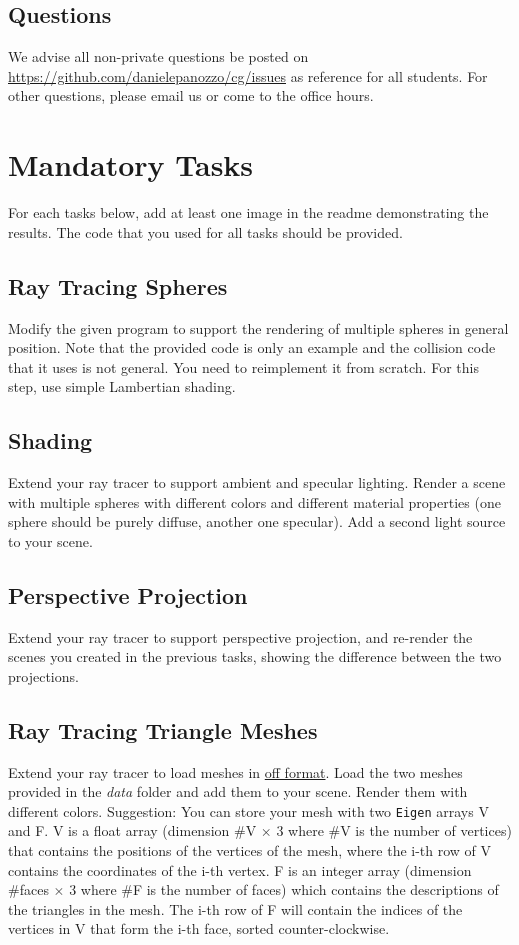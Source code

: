 \documentclass[11pt]{article}
\begin{document}
\subsection*{Questions}

We advise all non-private questions be posted on \url{https://github.com/danielepanozzo/cg/issues} as reference for all students.
For other questions, please email us or come to the office hours.
\section{Mandatory Tasks}
For each tasks below, add at least one image in the readme demonstrating the results. The code that you used for all tasks should be provided.

\subsection{Ray Tracing Spheres}

Modify the given program to support the rendering of multiple spheres in general position. Note that the provided code is only an example and the collision code that it uses is not general. You need to reimplement it from scratch.
For this step, use simple Lambertian shading. 

\subsection{Shading}

Extend your ray tracer to support ambient and specular lighting. Render a scene with multiple spheres with different colors and different material properties (one sphere should be purely diffuse, another one specular).
Add a second light source to your scene.

\subsection{Perspective Projection}

Extend your ray tracer to support perspective projection, and re-render the scenes you created in the previous tasks, showing the difference between the two projections.

\subsection{Ray Tracing Triangle Meshes}

Extend your ray tracer to load meshes in \href{https://en.wikipedia.org/wiki/OFF_(file_format)}{off format}. Load the two meshes provided in the \textit{data} folder and add them to your scene. Render them with different colors. Suggestion: You can store your mesh with two \texttt{Eigen} arrays V and F. V is a float array (dimension \#V $\times$ 3 where \#V is the number of vertices) that contains the positions of the vertices of the mesh, where the i-th row of V contains the coordinates of the i-th vertex. F is an integer array (dimension \#faces $\times$ 3 where \#F is the number of faces) which contains the descriptions of the triangles in the mesh. The i-th row of F will contain the indices of the vertices in V that form the i-th face, sorted counter-clockwise.
\end{document}
